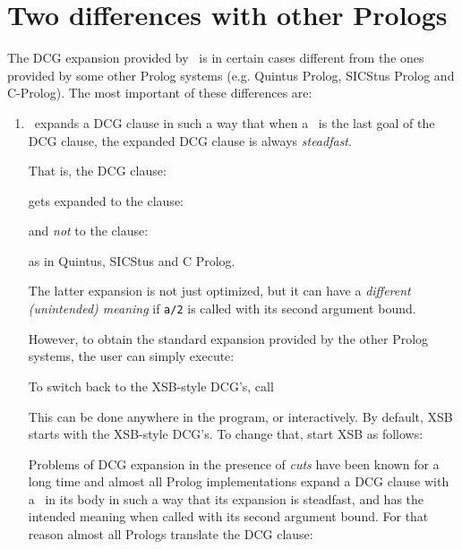 \section{Two differences with other Prologs}\label{sec-dcg-differences}
The DCG expansion provided by \ourprolog\ is in certain cases different 
from the ones provided by some other Prolog systems (e.g.  Quintus Prolog, 
SICStus Prolog and C-Prolog). The most important of these differences are:
\begin{enumerate}
\item \ourprolog\ expands a DCG clause in such a way that when a \cut\ is 
      the last goal of the DCG clause, the expanded DCG clause is always 
      {\em steadfast}.

      That is, the DCG clause:


      \noindent
      gets expanded to the clause:


      \noindent
      and {\em not\/} to the clause:


      \noindent
      as in Quintus, SICStus and C Prolog.

      The latter expansion is not just optimized, but it can have a
      {\em different (unintended) meaning} if {\tt a/2} is called with
      its second argument bound.

      However, to obtain the standard expansion provided by the other Prolog
      systems, the user can simply execute:
      
    
      To switch back to the XSB-style DCG's, call
      

      This can be done anywhere in the program, or interactively.
      By default, XSB starts with the XSB-style DCG's. To change that,
      start XSB as follows:


      Problems of DCG expansion in the presence of {\em cuts} have been known
      for a long time and almost all Prolog implementations expand a DCG
      clause with a \cut\ in its body in such a way that its expansion is
      steadfast, and has the intended meaning when called with its second
      argument bound.  For that reason almost all Prologs translate the DCG
      clause:


\end{enumerate}
